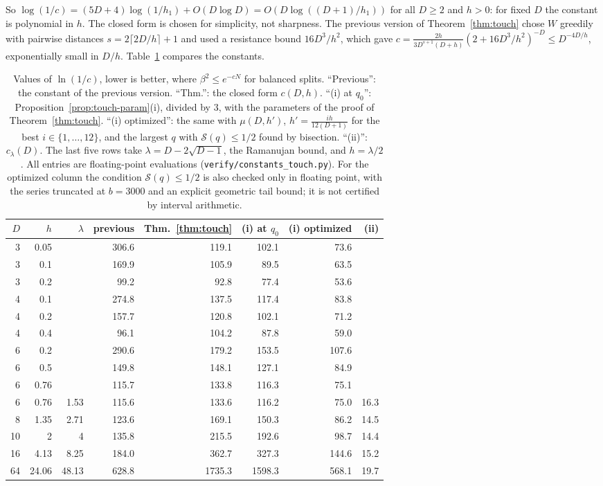 So $\log(1/c)=(5D+4)\log(1/h_1)+O(D\log D)=O(D\log((D+1)/h_1))$ for all $D\ge2$ and $h>0$: for fixed $D$ the constant is polynomial in $h$. The closed form is chosen for simplicity, not sharpness. The previous version of Theorem~\ref{thm:touch} chose $W$ greedily with pairwise distances $s=2\lceil2D/h\rceil+1$ and used a resistance bound $16D^3/h^2$, which gave $c=\frac{2h}{3D^{s+1}(D+h)}(2+16D^3/h^2)^{-D}\le D^{-4D/h}$, exponentially small in $D/h$. Table~\ref{tab:constants} compares the constants.

\begin{table}[t]
\centering
\small
\begin{tabular}{rrr|rrrr|r}
$D$ & $h$ & $\lambda$ & previous & Thm.~\ref{thm:touch} & (i) at $q_0$ & (i) optimized & (ii)\\\hline
3 & 0.05 & & 306.6 & 119.1 & 102.1 & 73.6 & \\
3 & 0.1 & & 169.9 & 105.9 & 89.5 & 63.5 & \\
3 & 0.2 & & 99.2 & 92.8 & 77.4 & 53.6 & \\
4 & 0.1 & & 274.8 & 137.5 & 117.4 & 83.8 & \\
4 & 0.2 & & 157.7 & 120.8 & 102.1 & 71.2 & \\
4 & 0.4 & & 96.1 & 104.2 & 87.8 & 59.0 & \\
6 & 0.2 & & 290.6 & 179.2 & 153.5 & 107.6 & \\
6 & 0.5 & & 149.8 & 148.1 & 127.1 & 84.9 & \\
6 & 0.76 & & 115.7 & 133.8 & 116.3 & 75.1 & \\\hline
6 & 0.76 & 1.53 & 115.6 & 133.6 & 116.2 & 75.0 & 16.3\\
8 & 1.35 & 2.71 & 123.6 & 169.1 & 150.3 & 86.2 & 14.5\\
10 & 2 & 4 & 135.8 & 215.5 & 192.6 & 98.7 & 14.4\\
16 & 4.13 & 8.25 & 184.0 & 362.7 & 327.3 & 144.6 & 15.2\\
64 & 24.06 & 48.13 & 628.8 & 1735.3 & 1598.3 & 568.1 & 19.7
\end{tabular}
\caption{Values of $\ln(1/c)$, lower is better, where $\beta^2\le e^{-cN}$ for balanced splits. ``Previous'': the constant of the previous version. ``Thm.'': the closed form $c(D,h)$. ``(i) at $q_0$'': Proposition~\ref{prop:touch-param}(i), divided by $3$, with the parameters of the proof of Theorem~\ref{thm:touch}. ``(i) optimized'': the same with $\mu(D,h')$, $h'=\frac{ih}{12(D+1)}$ for the best $i\in\{1,\dots,12\}$, and the largest $q$ with $\mathcal S(q)\le1/2$ found by bisection. ``(ii)'': $c_\lambda(D)$. The last five rows take $\lambda=D-2\sqrt{D-1}$, the Ramanujan bound, and $h=\lambda/2$. All entries are floating-point evaluations (\texttt{verify/constants\_touch.py}). For the optimized column the condition $\mathcal S(q)\le1/2$ is also checked only in floating point, with the series truncated at $b=3000$ and an explicit geometric tail bound; it is not certified by interval arithmetic.}
\label{tab:constants}
\end{table}

